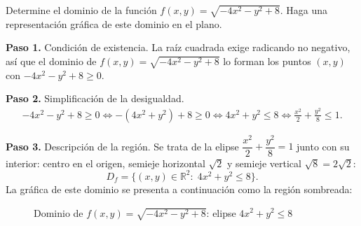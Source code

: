 \begin{prob}
Determine el dominio de la función $f(x,y)=\sqrt{-4x^2-y^2+8}$. Haga una representación gráfica de este dominio en el plano.
\begin{myproof}
\textbf{Paso 1.} Condición de existencia. La raíz cuadrada exige radicando no
negativo, así que el dominio de $f(x,y)=\sqrt{-4x^2-y^2+8}$ lo forman los
puntos $(x,y)$ con $-4x^2-y^2+8\geq 0.$

\textbf{Paso 2.} Simplificación de la desigualdad.
\begin{align*}
-4x^2-y^2+8\geq 0 \Leftrightarrow -(4x^2+y^2)+8\geq 0 \Leftrightarrow 4x^2+y^2\leq 8
\Leftrightarrow \frac{x^2}{2}+\frac{y^2}{8}\leq 1.
\end{align*}

\textbf{Paso 3.} Descripción de la región. Se trata de la elipse
$\dfrac{x^2}{2}+\dfrac{y^2}{8}=1$ junto con su interior: centro en el origen,
semieje horizontal $\sqrt{2}$ y semieje vertical $\sqrt{8}=2\sqrt{2}$:
\[
  \boxed{D_f=\{(x,y)\in\mathbb{R}^2:\;4x^2+y^2\leq 8\}.}
\]
La gráfica de este dominio se presenta a continuación como la región sombreada:
\begin{figure}[H]
\centering
{}
\caption{Dominio de $f(x,y)=\sqrt{-4x^2-y^2+8}$: elipse $4x^2+y^2\leq 8$}
\label{fig:dom_elipse_4x2y2}
\end{figure}
\end{myproof}
\end{prob}

